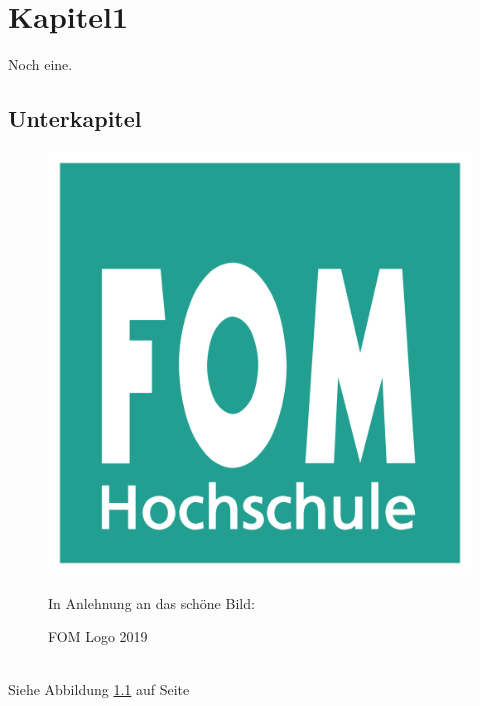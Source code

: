 \chapter{Kapitel1}
\blindtext{}\autocite{elk} Noch eine.\autocite[12]{elk}

\section{Unterkapitel}
\blindtext{}
\begin{figure}[!htb] 
   \centering 
   \begin{minipage}{8cm} 
   \caption{FOM Logo 2019} 
   \label{fig:fom_logo} 
   \includegraphics[width=\textwidth]{Abbildungen/fom_logo.png} 
   \par\smallskip 
   In Anlehnung an das schöne Bild: \cite[12]{elk}
   \end{minipage} 
\end{figure} 

\blindtext[12]{}\\
Siehe Abbildung \ref{fig:fom_logo} auf Seite \pageref{fig:fom_logo}